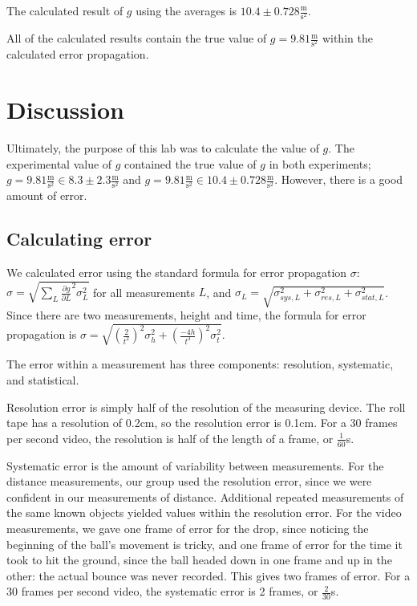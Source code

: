 \documentclass[12pt]{article}
\begin{document}
The calculated result of \(g\) using the averages is \(10.4\pm 0.728 \frac{\text{m}}{\text{s}^{2}}\).

All of the calculated results contain the true value of \(g = 9.81 \frac{\text{m}}{\text{s}^{2}}\) within the calculated error propagation.
\section{Discussion}
\label{sec:orge9f4c56}

Ultimately, the purpose of this lab was to calculate the value of \(g\). The experimental value of \(g\) contained the true value of \(g\) in both experiments; \(g = 9.81 \frac{\text{m}}{\text{s}^{2}} \in 8.3\pm2.3 \frac{\text{m}}{\text{s}^{2}}\) and \(g = 9.81 \frac{\text{m}}{\text{s}^{2}} \in 10.4\pm 0.728 \frac{\text{m}}{\text{s}^{2}}\). However, there is a good amount of error.
\subsection{Calculating error}
\label{sec:org6463e07}

We calculated error using the standard formula for error propagation \(\sigma\): \(\sigma = \sqrt{\sum_{L} \frac{\partial g}{\partial L}^{2}\sigma_{L}^{2}}\) for all measurements \(L\), and \(\sigma_{L}=\sqrt{\sigma_{sys,L}^{2}+\sigma_{res,L}^{2}+\sigma_{stat,L}^{2}}\). Since there are two measurements, height and time, the formula for error propagation is \(\sigma = \sqrt{ \left( \frac{2}{t^{2}} \right) ^{2} \sigma_{h}^{2} + \left( \frac{-4h}{t^{3}} \right)^{2}\sigma_{t}^{2} }\).

The error within a measurement has three components: resolution, systematic, and statistical.

Resolution error is simply half of the resolution of the measuring device. The roll tape has a resolution of 0.2cm, so the resolution error is 0.1cm. For a 30 frames per second video, the resolution is half of the length of a frame, or \(\frac{1}{60}\)s.

Systematic error is the amount of variability between measurements. For the distance measurements, our group used the resolution error, since we were confident in our measurements of distance. Additional repeated measurements of the same known objects yielded values within the resolution error. For the video measurements, we gave one frame of error for the drop, since noticing the beginning of the ball's movement is tricky, and one frame of error for the time it took to hit the ground, since the ball headed down in one frame and up in the other: the actual bounce was never recorded. This gives two frames of error. For a 30 frames per second video, the systematic error is 2 frames, or \(\frac{2}{30}\)s.
\end{document}
